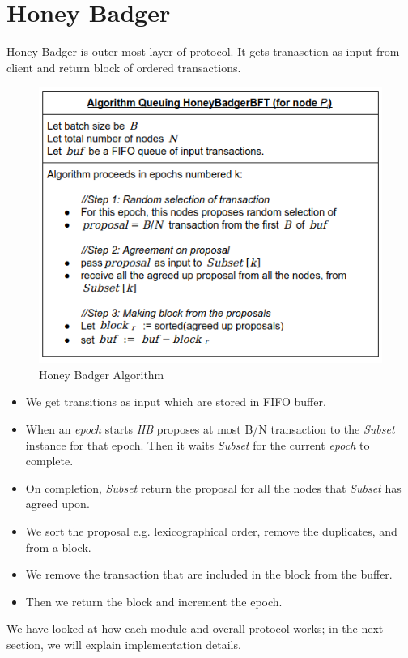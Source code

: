 \section{Honey Badger}
Honey Badger is outer most layer of protocol. It gets tranasction as input from client and return block of ordered transactions.
\begin{figure}[!h]
    \centering
    \includegraphics[scale=0.7]{images/qhb_algo.png}
    \caption{Honey Badger Algorithm\cite{miller2016honey}}
    \label{fig:qhb_algo}
\end{figure}
\begin{itemize}
    \item We get transitions as input which are stored in FIFO buffer.
    \item When an \textit{epoch} starts \textit{HB} proposes at most B/N transaction to the \textit{Subset} instance for that epoch. Then it waits  \textit{Subset} for the current \textit{epoch} to complete.
    \item On completion, \textit{Subset} return the proposal for all the nodes that \textit{Subset} has agreed upon.
    \item We sort the proposal e.g. lexicographical order, remove the duplicates, and from a block.
    \item We remove the transaction that are included in the block from the buffer.
    \item Then we return the block and increment the epoch.
\end{itemize}
We have looked at how each module and overall protocol works; in the next section, we will explain implementation details.
